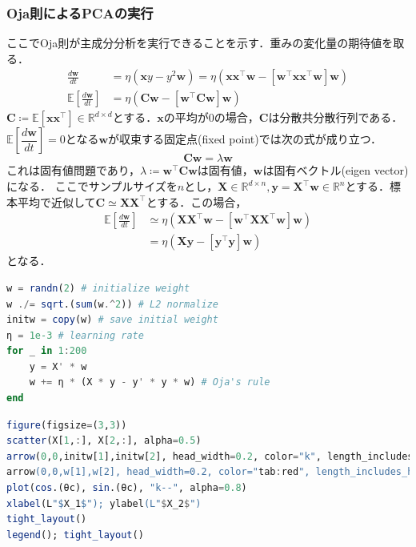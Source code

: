 \subsubsection{Oja則によるPCAの実行}
ここでOja則が主成分分析を実行できることを示す．重みの変化量の期待値を取る．
\begin{align}
\frac{d\mathbf{w}}{dt} &= \eta \left(\mathbf{x}y - y^2 \mathbf{w}\right)=\eta \left(\mathbf{x}\mathbf{x}^\top \mathbf{w} - \left[\mathbf{w}^\top \mathbf{x}\mathbf{x}^\top \mathbf{w}\right] \mathbf{w}\right)\\
\mathbb{E}\left[\frac{d\mathbf{w}}{dt}\right] &= \eta \left(\mathbf{C} \mathbf{w} - \left[\mathbf{w}^\top \mathbf{C} \mathbf{w}\right] \mathbf{w}\right)
\end{align}
$\mathbf{C}\coloneqq\mathbb{E}[\mathbf{x}\mathbf{x}^\top]\in \mathbb{R}^{d\times d}$とする．$\mathbf{x}$の平均が0の場合，$\mathbf{C}$は分散共分散行列である．$\mathbb{E}\left[\dfrac{d\mathbf{w}}{dt}\right]=0$となる$\mathbf{w}$が収束する固定点(fixed point)では次の式が成り立つ．
\begin{equation}
\mathbf{C}\mathbf{w} = \lambda \mathbf{w}
\end{equation}
これは固有値問題であり，$\lambda\coloneqq\mathbf{w}^\top \mathbf{C} \mathbf{w}$は固有値，$\mathbf{w}$は固有ベクトル(eigen vector)になる．
ここでサンプルサイズを$n$とし，$\mathbf{X} \in \mathbb{R}^{d\times n}, \mathbf{y}=\mathbf{X}^\top\mathbf{w} \in \mathbb{R}^n$とする．標本平均で近似して$\mathbf{C}\simeq \mathbf{X}\mathbf{X}^\top$とする．この場合，
\begin{align}
\mathbb{E}\left[\frac{d\mathbf{w}}{dt}\right] &\simeq \eta \left(\mathbf{X}\mathbf{X}^\top \mathbf{w} - \left[\mathbf{w}^\top \mathbf{X}\mathbf{X}^\top \mathbf{w}\right] \mathbf{w}\right)\\
&=\eta \left(\mathbf{X}\mathbf{y} - \left[\mathbf{y}^\top\mathbf{y}\right] \mathbf{w}\right)
\end{align}
となる．
\begin{lstlisting}[language=julia]
w = randn(2) # initialize weight
w ./= sqrt.(sum(w.^2)) # L2 normalize
initw = copy(w) # save initial weight
η = 1e-3 # learning rate
for _ in 1:200
    y = X' * w  
    w += η * (X * y - y' * y * w) # Oja's rule
end
\end{lstlisting}
\begin{lstlisting}[language=julia]
figure(figsize=(3,3))
scatter(X[1,:], X[2,:], alpha=0.5)
arrow(0,0,initw[1],initw[2], head_width=0.2, color="k", length_includes_head=true, label=L"Init. $w$")
arrow(0,0,w[1],w[2], head_width=0.2, color="tab:red", length_includes_head=true, label=L"Opt. $w$")
plot(cos.(θc), sin.(θc), "k--", alpha=0.8)
xlabel(L"$X_1$"); ylabel(L"$X_2$")
tight_layout()
legend(); tight_layout()
\end{lstlisting}
